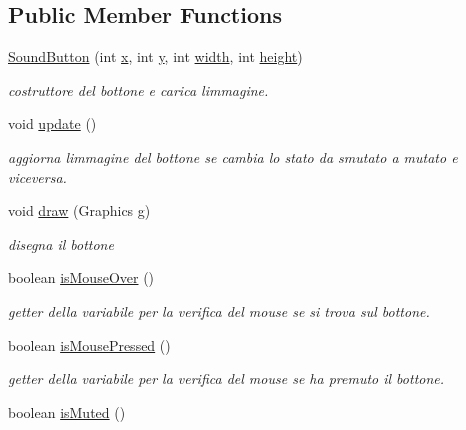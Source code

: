 \subsection*{Public Member Functions}
\begin{DoxyCompactItemize}
\item 
\hyperlink{classui_1_1_sound_button_a08aaedca13e6e5245ebf8ad14a2eeeaa}{Sound\+Button} (int \hyperlink{classui_1_1_pause_button_a6150e0515f7202e2fb518f7206ed97dc}{x}, int \hyperlink{classui_1_1_pause_button_a0a2f84ed7838f07779ae24c5a9086d33}{y}, int \hyperlink{classui_1_1_pause_button_a2474a5474cbff19523a51eb1de01cda4}{width}, int \hyperlink{classui_1_1_pause_button_ad12fc34ce789bce6c8a05d8a17138534}{height})
\begin{DoxyCompactList}\small\item\em costruttore del bottone e carica l\textquotesingle{}immagine. \end{DoxyCompactList}\item 
void \hyperlink{classui_1_1_sound_button_ac5c54df7ed3b930268c8d7752c101725}{update} ()
\begin{DoxyCompactList}\small\item\em aggiorna l\textquotesingle{}immagine del bottone se cambia lo stato da smutato a mutato e viceversa. \end{DoxyCompactList}\item 
void \hyperlink{classui_1_1_sound_button_a72fe1ffca978e99fd16994a10e7f8051}{draw} (Graphics g)
\begin{DoxyCompactList}\small\item\em disegna il bottone \end{DoxyCompactList}\item 
boolean \hyperlink{classui_1_1_sound_button_a2deebd864f1c01a6d81238349c929885}{is\+Mouse\+Over} ()
\begin{DoxyCompactList}\small\item\em getter della variabile per la verifica del mouse se si trova sul bottone. \end{DoxyCompactList}\item 
boolean \hyperlink{classui_1_1_sound_button_ad47389f2ab3067af3626db75a6b3b09e}{is\+Mouse\+Pressed} ()
\begin{DoxyCompactList}\small\item\em getter della variabile per la verifica del mouse se ha premuto il bottone. \end{DoxyCompactList}\item 
boolean \hyperlink{classui_1_1_sound_button_ab67171d139f4fbb66413cb6c42e83945}{is\+Muted} ()

\end{DoxyCompactItemize}
